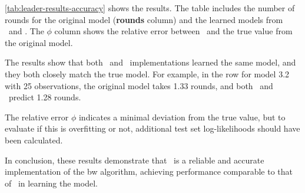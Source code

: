 \autoref{tab:leader-results-accuracy} shows the results. The table includes the number of rounds for the original model (\textbf{rounds} column) and the learned models from \Jajapy\ and \Cupaal.
The $\phi$ column shows the relative error between \Jajapy\ and the true value from the original model.

The results show that both \Cupaal\ and \Jajapy\  implementations learned the same model, and they both closely match the true model. For example, in the row for model 3.2 with 25 observations, the original model takes 1.33 rounds, and both \Cupaal\ and \Jajapy\  predict 1.28 rounds.

The relative error $\phi$ indicates a minimal deviation from the true value, but to evaluate if this is overfitting or not, additional test set log-likelihoods should have been calculated.

In conclusion, these results demonstrate that \Cupaal\ is a reliable and accurate implementation of the \gls{bw} algorithm, achieving performance comparable to that of \Jajapy\ in learning the model.



